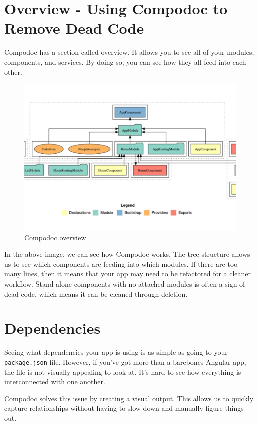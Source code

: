 \section{Overview - Using Compodoc to Remove Dead Code}
Compodoc has a section called overview. It allows you to see all of your modules, components, and services. By doing so, you can see how they all feed into each other. 

\begin{figure}
\caption{Compodoc overview}
\includegraphics[width=414pt]{graphics/compodoc/compodoc-overview-screenshot.pdf}
\end{figure}

In the above image, we can see how Compodoc works. The tree structure allows us to see which components are feeding into which modules. If there are too many lines, then it means that your app may need to be refactored for a cleaner workflow. Stand alone components with no attached modules is often a sign of dead code, which means it can be cleaned through deletion. 


\section{Dependencies}
Seeing what dependencies your app is using is as simple as going to your \lstinline{package.json} file. However, if you've got more than a barebones Angular app, the file is not visually appealing to look at. It's hard to see how everything is interconnected with one another. 

Compodoc solves this issue by creating a visual output. This allows us to quickly capture relationships without having to slow down and manually figure things out. 

